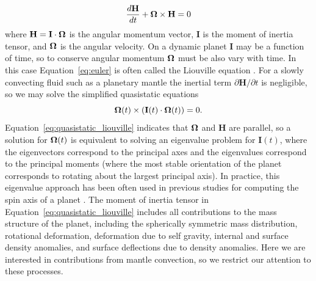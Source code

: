 \documentclass[extra,mreferee]{gji}
\begin{document}
\begin{equation}
\frac{d \mathbf{H}}{dt} + \mitbf{\Omega} \times \mathbf{H} = 0
\label{eq:euler}
\end{equation}
where $\mathbf{H} = \mathbf{I} \cdot \mitbf{\Omega}$ is the angular momentum vector, $\mathbf{I}$ is the moment of inertia tensor, and $\mitbf{\Omega}$ is the angular velocity.
On a dynamic planet $\mathbf{I}$ may be a function of time, so to conserve angular momentum $\mitbf{\Omega}$ must be also vary with time.
In this case Equation~\eqref{eq:euler} is often called the Liouville equation \citep[e.g.][]{munk1960rotation}.
For a slowly convecting fluid such as a planetary mantle the inertial term $\partial \mathbf{H} / \partial t$ is negligible, so we may solve the simplified quasistatic equations
\begin{equation}
\mitbf{\Omega } (t)\times ( \mathbf{I}(t) \cdot \mitbf{\Omega }(t) ) = 0.
\label{eq:quasistatic_liouville}
\end{equation}
Equation~\eqref{eq:quasistatic_liouville} indicates that $\mitbf{\Omega}$ and $\mathbf{H}$ are parallel, so a solution for $\mitbf{\Omega}(t)$ is equivalent to solving an eigenvalue problem for $\mathbf{I}(t)$, where the eigenvectors correspond to the principal axes and the eigenvalues correspond to the principal moments (where the most stable orientation of the planet corresponds to rotating about the largest principal axis).
In practice, this eigenvalue approach has been often used in previous studies for computing the spin axis of a planet \citep[e.g.][]{steinberger1997changes, roberts2007cause}.
The moment of inertia tensor in Equation~\eqref{eq:quasistatic_liouville} includes all contributions to the mass structure
of the planet, including the spherically symmetric mass distribution, rotational deformation, deformation due to self gravity, internal and surface density anomalies, and surface deflections due to density anomalies.
Here we are interested in contributions from mantle convection, so we restrict our attention to these processes.
\end{document}
